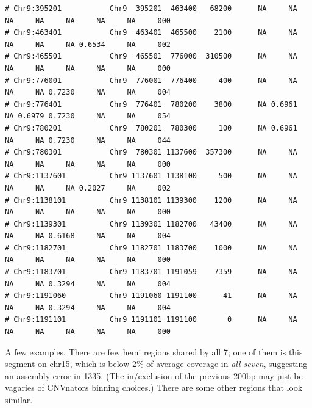 \documentclass{article}\usepackage[]{graphicx}\usepackage[]{color}
\makeatletter
\newenvironment{kframe}{%
 \def\at@end@of@kframe{}%
 \ifinner\ifhmode%
  \def\at@end@of@kframe{\end{minipage}}%
  \begin{minipage}{\columnwidth}%
 \fi\fi%
 \def\FrameCommand##1{\hskip\@totalleftmargin \hskip-\fboxsep
 \colorbox{shadecolor}{##1}\hskip-\fboxsep
     \hskip-\linewidth \hskip-\@totalleftmargin \hskip\columnwidth}%
 \MakeFramed {\advance\hsize-\width
   \@totalleftmargin\z@ \linewidth\hsize
   \@setminipage}}%
 {\par\unskip\endMakeFramed%
 \at@end@of@kframe}
\newenvironment{knitrout}{}{} %
\makeatother
\begin{document}
\begin{knitrout}
\begin{kframe}
\begin{verbatim}
# Chr9:395201           Chr9  395201  463400   68200      NA     NA     NA     NA     NA     NA     NA     000
# Chr9:463401           Chr9  463401  465500    2100      NA     NA     NA     NA     NA 0.6534     NA     002
# Chr9:465501           Chr9  465501  776000  310500      NA     NA     NA     NA     NA     NA     NA     000
# Chr9:776001           Chr9  776001  776400     400      NA     NA     NA     NA 0.7230     NA     NA     004
# Chr9:776401           Chr9  776401  780200    3800      NA 0.6961     NA 0.6979 0.7230     NA     NA     054
# Chr9:780201           Chr9  780201  780300     100      NA 0.6961     NA     NA 0.7230     NA     NA     044
# Chr9:780301           Chr9  780301 1137600  357300      NA     NA     NA     NA     NA     NA     NA     000
# Chr9:1137601          Chr9 1137601 1138100     500      NA     NA     NA     NA     NA 0.2027     NA     002
# Chr9:1138101          Chr9 1138101 1139300    1200      NA     NA     NA     NA     NA     NA     NA     000
# Chr9:1139301          Chr9 1139301 1182700   43400      NA     NA     NA     NA 0.6168     NA     NA     004
# Chr9:1182701          Chr9 1182701 1183700    1000      NA     NA     NA     NA     NA     NA     NA     000
# Chr9:1183701          Chr9 1183701 1191059    7359      NA     NA     NA     NA 0.3294     NA     NA     004
# Chr9:1191060          Chr9 1191060 1191100      41      NA     NA     NA     NA 0.3294     NA     NA     004
# Chr9:1191101          Chr9 1191101 1191100       0      NA     NA     NA     NA     NA     NA     NA     000
\end{verbatim}
\end{kframe}
\end{knitrout}

A few examples.  There are few hemi regions shared by all 7; one of them is this segment on chr15, which is below 2\% of average coverage in \emph{all seven}, suggesting an assembly error in 1335.  (The in/exclusion of the previous 200bp may just be vagaries of CNVnators binning choices.)  There are some other regions that look similar.
\end{document}
